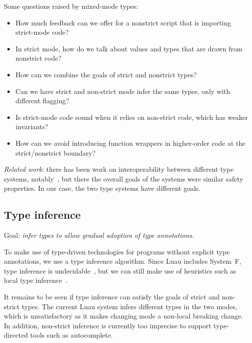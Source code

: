 \documentclass[acmsmall]{acmart}
\begin{document}
Some questions raised by mixed-mode types:
\begin{itemize}

\item How much feedback can we offer for a nonstrict script that is
  importing strict-mode code?

\item In strict mode, how do we talk about values and types that are
  drawn from nonstrict code?

\item How can we combine the goals of strict and nonstrict types?

\item Can we have strict and non-strict mode infer the same types,
  only with different flagging?

\item Is strict-mode code sound when it relies on non-strict code,
  which has weaker invariants?

\item How can we avoid introducing function wrappers in higher-order code
  at the strict/nonstrict boundary?

\end{itemize}
\emph{Related work}: there has been work on interoperability between different type systems,
notably~\cite{LinkingTypes}, but there the overall goals of the systems were similar safety properties.
In our case, the two type systems have different goals.

\subsection{Type inference}

Goal: \emph{infer types to allow gradual adoption of type annotations.}

To make use of type-driven technologies for programs
without explicit type annotations, we use a type inference algorithm.
Since Luau includes System~F, type inference is undecidable~\cite{Boehm85},
but we can still make use of heuristics such as local type inference~\cite{LocalTypeInference}.

It remains to be seen if type inference can satisfy the goals of
strict and non-strict types. The current Luau system
infers different types in the two modes, which is unsatisfactory as it
makes changing mode a non-local breaking change. In addition,
non-strict inference is currently too imprecise to support
type-directed tools such as autocomplete.
\end{document}
